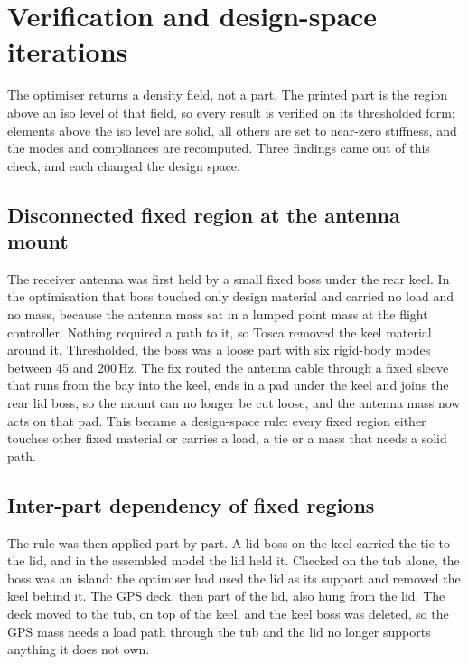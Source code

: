 \section{Verification and design-space iterations}\label{sec:iterations}

The optimiser returns a density field, not a part. The printed part is the region above an iso level of that field, so every result is verified on its thresholded form: elements above the iso level are solid, all others are set to near-zero stiffness, and the modes and compliances are recomputed. Three findings came out of this check, and each changed the design space.

\subsection{Disconnected fixed region at the antenna mount}

The receiver antenna was first held by a small fixed boss under the rear keel. In the optimisation that boss touched only design material and carried no load and no mass, because the antenna mass sat in a lumped point mass at the flight controller. Nothing required a path to it, so Tosca removed the keel material around it. Thresholded, the boss was a loose part with six rigid-body modes between 45 and 200\,Hz. The fix routed the antenna cable through a fixed sleeve that runs from the bay into the keel, ends in a pad under the keel and joins the rear lid boss, so the mount can no longer be cut loose, and the antenna mass now acts on that pad. This became a design-space rule: every fixed region either touches other fixed material or carries a load, a tie or a mass that needs a solid path.

\subsection{Inter-part dependency of fixed regions}

The rule was then applied part by part. A lid boss on the keel carried the tie to the lid, and in the assembled model the lid held it. Checked on the tub alone, the boss was an island: the optimiser had used the lid as its support and removed the keel behind it. The GPS deck, then part of the lid, also hung from the lid. The deck moved to the tub, on top of the keel, and the keel boss was deleted, so the GPS mass needs a load path through the tub and the lid no longer supports anything it does not own.

